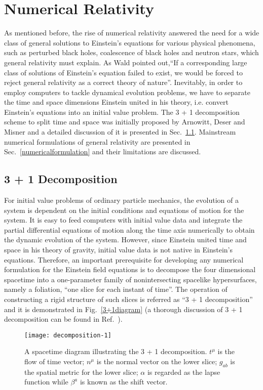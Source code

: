 \chapter{Numerical Relativity}\label{nr}
As mentioned before, the rise of numerical relativity answered the need for a wide class of general solutions to Einstein's equations for various physical phenomena, such as perturbed black holes, coalescence of black holes and neutron stars, which general relativity must explain. As Wald pointed out,``If a corresponding large class of solutions of Einstein's equation failed to exist, we would be forced to reject general relativity as a correct theory of nature''\cite{Wald:GRbook}. Inevitably, in order to employ computers to tackle dynamical evolution problems, we have to separate the time and space dimensions Einstein united in his theory, i.e. convert Einstein's equations into an initial value problem. The 3 + 1 decomposition scheme to split time and space was initially proposed by Arnowitt, Deser and Misner\cite{ADM:Witten} and a detailed discussion of it is presented in Sec.~\ref{3+1}. Mainstream numerical formulations of general relativity are presented in Sec.~\ref{numericalformulation} and their limitations are discussed. 
\section{3 + 1 Decomposition}\label{3+1}
For initial value problems of ordinary particle mechanics, the evolution of a system is dependent on the initial conditions and equations of motion for the system. It is easy to feed computers with initial value data and integrate the partial differential equations of motion along the time axis numerically to obtain the dynamic evolution of the system. However, since Einstein united time and space in his theory of gravity, initial value data is not native in Einstein's equations. Therefore, an important prerequisite for developing any numerical formulation for the Einstein field equations is to decompose the four dimensional spacetime into a one-parameter family of nonintersecting spacelike hypersurfaces, namely a foliation, ``one slice for each instant of time''. The operation of constructing a rigid structure of such slices is referred as ``3 + 1 decomposition'' and it is demonstrated in Fig.~\ref{3+1diagram} (a thorough discussion of 3 + 1 decomposition can be found in Ref.~\cite{Gourgoulhon:2007ue}). 

\begin{figure}[hbtp]
\centering
\texttt{[image: decomposition-1]}
\caption{A spacetime diagram illustrating the 3 + 1 decomposition. $t^{\mu}$ is the flow of time vector; $n^{\mu}$ is the normal vector on the lower slice; $g_{ab}$ is the spatial metric for the lower slice; $\alpha$ is regarded as the lapse function while $\beta^{a}$ is known as the shift vector. }
\end{figure}\label{3+1diagram}

